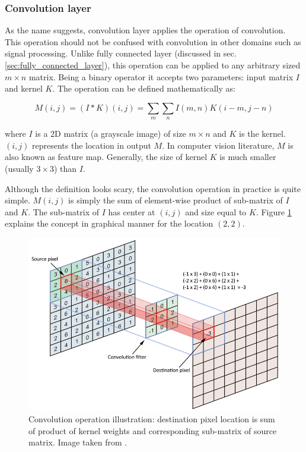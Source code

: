 \subsubsection{Convolution layer}
As the name suggests, convolution layer applies the operation of convolution. This operation should not be confused with convolution in other domains such as signal processing. Unlike fully connected layer (discussed in sec. \ref{sec:fully_connected_layer}), this operation can be applied to any arbitrary sized $m \times n$ matrix. Being a binary operator it accepts two parameters: input matrix $I$ and kernel $K$. The operation can be defined mathematically as:

$$ M(i,j)=(I*K)(i,j)=\sum_m\sum_n I(m,n)K(i-m,j-n)$$

where $I$ is a 2D matrix (a grayscale image) of size $m \times n$ and $K$ is the kernel\cite{goodfellow2016deep}. $(i,j)$ represents the location in output $M$. In computer vision literature, $M$ is also known as feature map. Generally, the size of kernel $K$ is much smaller (usually $3\times 3$) than $I$.

Although the definition looks scary, the convolution operation in practice is quite simple. $M(i,j)$ is simply the sum of element-wise product of sub-matrix of $I$ and $K$. The sub-matrix of $I$ has center at $(i,j)$ and size equal to $K$. Figure \ref{fig:convolution-op} explains the concept in graphical manner for the location $(2,2)$.


\begin{figure}
    \centering
    \includegraphics[width=0.8\linewidth]{images/convolution-op.png}
    \caption[Convolution operation]{Convolution operation illustration: destination pixel location is sum of product of kernel weights and corresponding sub-matrix of source matrix. Image taken from \cite{convolution-op}.}
    \label{fig:convolution-op}
\end{figure}

